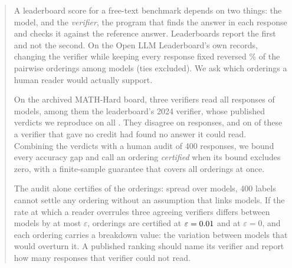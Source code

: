\begin{abstract}
A leaderboard score for a free-text benchmark depends on two things: the model, and the
\emph{verifier}, the program that finds the answer in each response and checks it against the
reference answer. Leaderboards report the first and not the second. On the Open LLM Leaderboard's own
records, changing the verifier while keeping every response fixed reversed
\BoardShiftDiscordantPct\% of the pairwise orderings among \BoardShiftModels{} models (ties
excluded). We ask which orderings a human reader would actually support.

On the archived MATH-Hard board, three verifiers read all \NumRows{} responses of \NumModels{}
models, among them the leaderboard's 2024 verifier, whose published verdicts we reproduce on all
\EmReexecItems{}. They disagree on \RowsAnyDisagree{} responses, and on \TaxExtraction{} of these a
verifier that gave no credit had found no answer it could read. Combining the verdicts with a human
audit of 400 responses, we bound every accuracy gap and call an ordering \emph{certified} when its
bound excludes zero, with a finite-sample guarantee that covers all \NumOrderings{} orderings at once.

The audit alone certifies \CertFixedNoPooling{} of the \NumOrderings{} orderings: spread over
\NumModels{} models, 400 labels cannot settle any ordering without an assumption that links models. If the rate at which a reader
overrules three agreeing verifiers differs between models by at most $\varepsilon$,
\CertFixedPrereg{} orderings are certified at $\varepsilon = \EpsPrereg$ and \CertFixedEpsZero{} at
$\varepsilon = 0$, and each ordering carries a breakdown value: the variation between models that
would overturn it. A published ranking should name its verifier and report how many responses that
verifier could not read.
\end{abstract}
